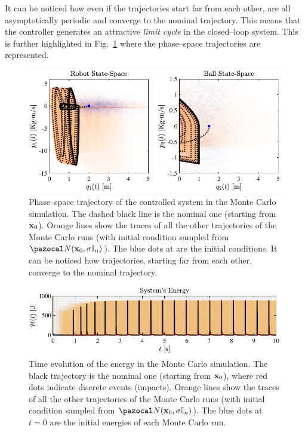 It can be noticed how even if the trajectories start far from each other, are all asymptotically periodic and converge to the nominal trajectory. This means that the controller generates an attractive \textit{limit cycle} in the closed--loop system. This is further highlighted in Fig.~\ref{fig:reg2} where the phase--space trajectories are represented.

\begin{figure}[!ht]
	\centering
	\includegraphics[width = \linewidth]{Figures/reg2.pdf}
	\caption[Phase--space trajectory of the controlled system in the Monte Carlo simulation]{Phase--space trajectory of the controlled system in the Monte Carlo simulation. The dashed black line is the nominal one (starting from $\mathbf{x}_0$). Orange lines show the traces of all the other trajectories of the Monte Carlo runs (with initial condition sampled from $\N(\xb_0,\sigma\mathbb{I}_n)$). The blue dots at are the initial conditions. It can be noticed how trajectories, starting far from each other, converge to the nominal trajectory.}
	\label{fig:reg2}
\end{figure}

\begin{figure}[!hb]
	\centering
	\includegraphics[width = \linewidth]{Figures/reg3.pdf}
	\caption[Time evolution of the energy in the Monte Carlo simulation]{Time evolution of the energy in the Monte Carlo simulation. The black trajectory is the nominal one (starting from $\mathbf{x}_0$), where red dots indicate discrete events (impacts). Orange lines show the traces of all the other trajectories of the Monte Carlo runs (with initial condition sampled from $\N(\xb_0,\sigma\mathbb{I}_n)$). The blue dots at $t=0$ are the initial energies of each Monte Carlo run.}
	\label{fig:reg3}
\end{figure}

